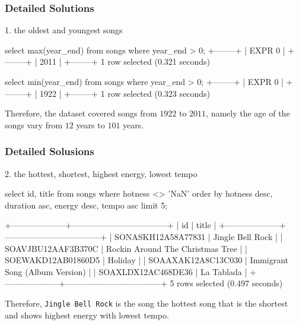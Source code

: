 \documentclass{beamer}
\begin{document}
\begin{frame}[fragile]
\frametitle{Detailed Solutions}

1. the oldest and youngest songs

\begin{mycodesql}
select max(year_end) from songs where year_end > 0;
+--------+ 
| EXPR 0 |
+--------+
| 2011   |
+--------+                                                                      
1 row selected (0.321 seconds)

select min(year_end) from songs where year_end > 0;              
+--------+
| EXPR 0 |
+--------+
| 1922   |
+--------+
1 row selected (0.323 seconds)
\end{mycodesql}


Therefore, the dataset covered songs from $1922$ to $2011$, namely the age of the songs vary from $12$ years to $101$ years.
\end{frame}

\begin{frame}[fragile]
    \frametitle{Detailed Solusions}

2. the hottest, shortest, highest energy, lowest tempo

\begin{mycodesql}
select id, title from songs 
where hotness <> 'NaN'
order by hotness desc, duration asc, energy desc, tempo asc
limit 5;

+--------------------+-----------------------------------+
|         id         |               title               | 
+--------------------+-----------------------------------+
| SONASKH12A58A77831 | Jingle Bell Rock                  |
| SOAVJBU12AAF3B370C | Rockin Around The Christmas Tree  |
| SOEWAKD12AB01860D5 | Holiday                           |
| SOAAXAK12A8C13C030 | Immigrant Song (Album Version)    |
| SOAXLDX12AC468DE36 | La Tablada                        |
+--------------------+-----------------------------------+
5 rows selected (0.497 seconds) 
\end{mycodesql}

Therefore, \verb|Jingle Bell Rock| is the song the hottest song that is the shortest and shows highest energy with lowest tempo.

\end{frame}
\end{document}
